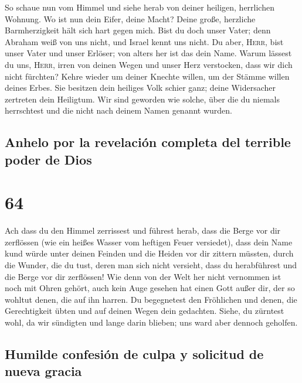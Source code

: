  So schaue nun vom Himmel und siehe herab von deiner
heiligen, herrlichen Wohnung. Wo ist nun dein Eifer, deine Macht? Deine
große, herzliche Barmherzigkeit hält sich hart gegen mich.
 Bist du doch unser Vater; denn Abraham weiß von uns
nicht, und Israel kennt uns nicht. Du aber, \textsc{Herr}, bist unser
Vater und unser Erlöser; von alters her ist das dein Name.
 Warum lässest du uns, \textsc{Herr}, irren von deinen
Wegen und unser Herz verstocken, dass wir dich nicht fürchten? Kehre
wieder um deiner Knechte willen, um der Stämme willen deines Erbes.
 Sie besitzen dein heiliges Volk schier ganz; deine
Widersacher zertreten dein Heiligtum.  Wir sind geworden
wie solche, über die du niemals herrschtest und die nicht nach deinem
Namen genannt wurden.

\hypertarget{anhelo-por-la-revelaciuxf3n-completa-del-terrible-poder-de-dios}{%
\subsection{Anhelo por la revelación completa del terrible poder de
Dios}\label{anhelo-por-la-revelaciuxf3n-completa-del-terrible-poder-de-dios}}

\hypertarget{section-63}{%
\section{64}\label{section-63}}

 Ach dass du den Himmel zerrissest und führest herab, dass
die Berge vor dir zerflössen (wie ein heißes Wasser vom heftigen Feuer
versiedet), dass dein Name kund würde unter deinen Feinden und die
Heiden vor dir zittern müssten,  durch die Wunder, die du
tust, deren man sich nicht versieht, dass du herabführest und die Berge
vor dir zerflössen!  Wie denn von der Welt her nicht
vernommen ist noch mit Ohren gehört, auch kein Auge gesehen hat einen
Gott außer dir, der so wohltut denen, die auf ihn harren. 
Du begegnetest den Fröhlichen und denen, die Gerechtigkeit übten und auf
deinen Wegen dein gedachten. Siehe, du zürntest wohl, da wir sündigten
und lange darin blieben; uns ward aber dennoch geholfen.

\hypertarget{humilde-confesiuxf3n-de-culpa-y-solicitud-de-nueva-gracia}{%
\subsection{Humilde confesión de culpa y solicitud de nueva
gracia}\label{humilde-confesiuxf3n-de-culpa-y-solicitud-de-nueva-gracia}}

